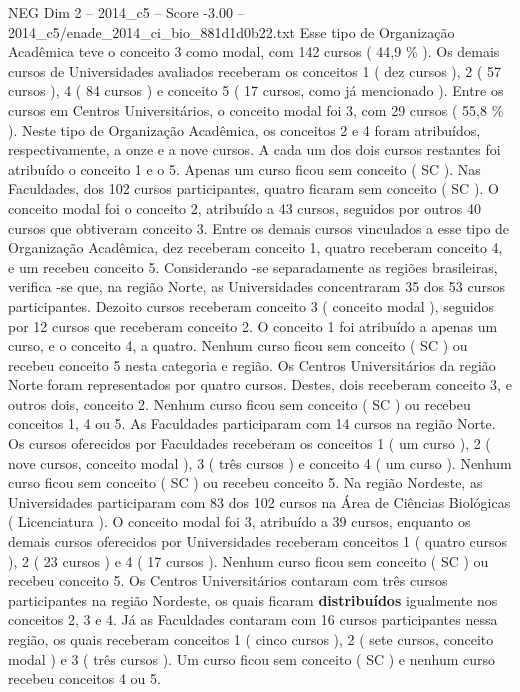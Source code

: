 \begin{textsample}{NEG Dim 2 – 2014\_c5 – Score -3.00 – 2014\_c5/enade\_2014\_ci\_bio\_881d1d0b22.txt}
Esse tipo de Organização Acadêmica teve o conceito 3 como modal, com 142 cursos ( 44,9 \% ).
Os demais cursos de Universidades avaliados receberam os conceitos 1 ( dez cursos ), 2 ( 57 cursos ), 4 ( 84 cursos ) e conceito 5 ( 17 cursos, como já mencionado ).
Entre os cursos em Centros Universitários, o conceito modal foi 3, com 29 cursos ( 55,8 \% ).
Neste tipo de Organização Acadêmica, os conceitos 2 e 4 foram atribuídos, respectivamente, a onze e a nove cursos.
A cada um dos dois cursos restantes foi atribuído o conceito 1 e o 5.
Apenas um curso ficou sem conceito ( SC ).
Nas Faculdades, dos 102 cursos participantes, quatro ficaram sem conceito ( SC ).
O conceito modal foi o conceito 2, atribuído a 43 cursos, seguidos por outros 40 cursos que obtiveram conceito 3.
Entre os demais cursos vinculados a esse tipo de Organização Acadêmica, dez receberam conceito 1, quatro receberam conceito 4, e um recebeu conceito 5.
Considerando -se separadamente as regiões brasileiras, verifica -se que, na região Norte, as Universidades concentraram 35 dos 53 cursos participantes.
Dezoito cursos receberam conceito 3 ( conceito modal ), seguidos por 12 cursos que receberam conceito 2.
O conceito 1 foi atribuído a apenas um curso, e o conceito 4, a quatro.
Nenhum curso ficou sem conceito ( SC ) ou recebeu conceito 5 nesta categoria e região.
Os Centros Universitários da região Norte foram representados por quatro cursos.
Destes, dois receberam conceito 3, e outros dois, conceito 2.
Nenhum curso ficou sem conceito ( SC ) ou recebeu conceitos 1, 4 ou 5.
As Faculdades participaram com 14 cursos na região Norte.
Os cursos oferecidos por Faculdades receberam os conceitos 1 ( um curso ), 2 ( nove cursos, conceito modal ), 3 ( três cursos ) e conceito 4 ( um curso ).
Nenhum curso ficou sem conceito ( SC ) ou recebeu conceito 5.
Na região Nordeste, as Universidades participaram com 83 dos 102 cursos na Área de Ciências Biológicas ( Licenciatura ).
O conceito modal foi 3, atribuído a 39 cursos, enquanto os demais cursos oferecidos por Universidades receberam conceitos 1 ( quatro cursos ), 2 ( 23 cursos ) e 4 ( 17 cursos ).
Nenhum curso ficou sem conceito ( SC ) ou recebeu conceito 5.
Os Centros Universitários contaram com três cursos participantes na região Nordeste, os quais ficaram \textbf{distribuídos} igualmente nos conceitos 2, 3 e 4.
Já as Faculdades contaram com 16 cursos participantes nessa região, os quais receberam conceitos 1 ( cinco cursos ), 2 ( sete cursos, conceito modal ) e 3 ( três cursos ).
Um curso ficou sem conceito ( SC ) e nenhum curso recebeu conceitos 4 ou 5.

\end{textsample}
